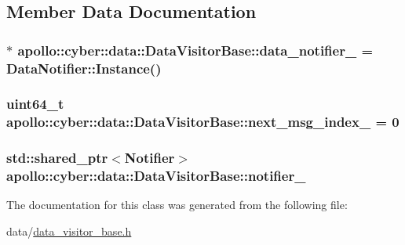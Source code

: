 \subsection{Member Data Documentation}
\hypertarget{classapollo_1_1cyber_1_1data_1_1DataVisitorBase_ac8ac7c3bb6c789652df9155e65504ae8}{
\subsubsection[{data\-\_\-notifier\-\_\-}]{$\ast$ apollo\-::cyber\-::data\-::\-Data\-Visitor\-Base\-::data\-\_\-notifier\-\_\- = Data\-Notifier\-::\-Instance()\hspace{0.3cm}{\ttfamily [protected]}}}\label{classapollo_1_1cyber_1_1data_1_1DataVisitorBase_ac8ac7c3bb6c789652df9155e65504ae8}
\hypertarget{classapollo_1_1cyber_1_1data_1_1DataVisitorBase_a976dda8aacd357161f4b6e49b699063e}{
\subsubsection[{next\-\_\-msg\-\_\-index\-\_\-}]{\setlength{\rightskip}{0pt plus 5cm}uint64\-\_\-t apollo\-::cyber\-::data\-::\-Data\-Visitor\-Base\-::next\-\_\-msg\-\_\-index\-\_\- = 0\hspace{0.3cm}{\ttfamily [protected]}}}\label{classapollo_1_1cyber_1_1data_1_1DataVisitorBase_a976dda8aacd357161f4b6e49b699063e}
\hypertarget{classapollo_1_1cyber_1_1data_1_1DataVisitorBase_a812c283846d1071937478c6ad23daa17}{
\subsubsection[{notifier\-\_\-}]{\setlength{\rightskip}{0pt plus 5cm}std\-::shared\-\_\-ptr$<${\bf Notifier}$>$ apollo\-::cyber\-::data\-::\-Data\-Visitor\-Base\-::notifier\-\_\-\hspace{0.3cm}{\ttfamily [protected]}}}\label{classapollo_1_1cyber_1_1data_1_1DataVisitorBase_a812c283846d1071937478c6ad23daa17}


The documentation for this class was generated from the following file\-:\begin{DoxyCompactItemize}
\item 
data/\hyperlink{data__visitor__base_8h}{data\-\_\-visitor\-\_\-base.\-h}\end{DoxyCompactItemize}

